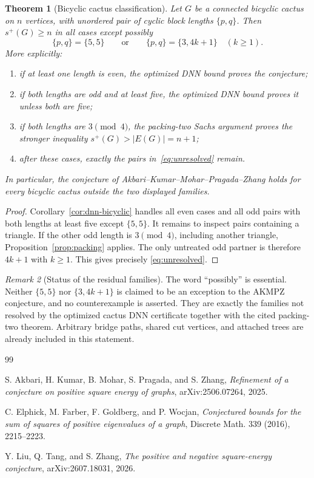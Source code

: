 \documentclass[11pt]{article}
\newtheorem{theorem}{Theorem}[section]
\theoremstyle{remark}
\newtheorem{remark}[theorem]{Remark}
\begin{document}
\begin{theorem}[Bicyclic cactus classification]\label{thm:classification}
Let $G$ be a connected bicyclic cactus on $n$ vertices, with unordered pair
of cyclic block lengths $\{p,q\}$.  Then $s^+(G)\geq n$ in all cases except
possibly
\begin{equation}\label{eq:unresolved}
 \{p,q\}=\{5,5\}
 \qquad\text{or}\qquad
 \{p,q\}=\{3,4k+1\}\quad(k\geq1).
\end{equation}
More explicitly:
\begin{enumerate}
\item if at least one length is even, the optimized DNN bound proves the
      conjecture;
\item if both lengths are odd and at least five, the optimized DNN bound
      proves it unless both are five;
\item if both lengths are $3\pmod4$, the packing-two Sachs argument proves the
      stronger inequality $s^+(G)>|E(G)|=n+1$;
\item after these cases, exactly the pairs in~\eqref{eq:unresolved} remain.
\end{enumerate}
In particular, the conjecture of
Akbari--Kumar--Mohar--Pragada--Zhang holds for every bicyclic cactus outside
the two displayed families.
\end{theorem}

\begin{proof}
Corollary~\ref{cor:dnn-bicyclic} handles all even cases and all odd pairs with
both lengths at least five except $\{5,5\}$.  It remains to inspect pairs
containing a triangle.  If the other odd length is $3\pmod4$, including
another triangle, Proposition~\ref{prop:packing} applies.  The only untreated
odd partner is therefore $4k+1$ with $k\geq1$.  This gives precisely
\eqref{eq:unresolved}.
\end{proof}

\begin{remark}[Status of the residual families]
The word ``possibly'' is essential.  Neither $\{5,5\}$ nor
$\{3,4k+1\}$ is claimed to be an exception to the AKMPZ conjecture, and no
counterexample is asserted.  They are exactly the families not resolved by
the optimized cactus DNN certificate together with the cited packing-two
theorem.  Arbitrary bridge paths, shared cut vertices, and attached trees are
already included in this statement.
\end{remark}

\begin{thebibliography}{99}

S. Akbari, H. Kumar, B. Mohar, S. Pragada, and S. Zhang,
\emph{Refinement of a conjecture on positive square energy of graphs},
arXiv:2506.07264, 2025.

C. Elphick, M. Farber, F. Goldberg, and P. Wocjan,
\emph{Conjectured bounds for the sum of squares of positive eigenvalues of a
graph},
Discrete Math. 339 (2016), 2215--2223.

Y. Liu, Q. Tang, and S. Zhang,
\emph{The positive and negative square-energy conjecture},
arXiv:2607.18031, 2026.

\end{thebibliography}
\end{document}

